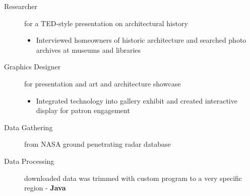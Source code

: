 \documentclass[a4paper]{deedy-resume} %
\begin{document}

    \fi
    
    
    
    \begin{description}
    \item[Researcher] for a TED-style presentation on architectural history 
    
    \iftrue

    \begin{itemize}
        \item Interviewed homeowners of historic architecture and searched photo archives at museums and libraries
    \end{itemize}

    \fi

    \item[Graphics Designer] for presentation and art and architecture showcase
    
    \iftrue

    \begin{itemize}
        \item Integrated technology into gallery exhibit and created interactive display for patron engagement
    \end{itemize}

    \fi
    \end{description}
    
    
        
    \iftrue

    \begin{description}
        \item[Data Gathering] from NASA ground penetrating radar database 
        \item[Data Processing] downloaded data was trimmed with custom program to a very specific region - \textbf{Java}
    \end{description}
    \fi
\end{document}
